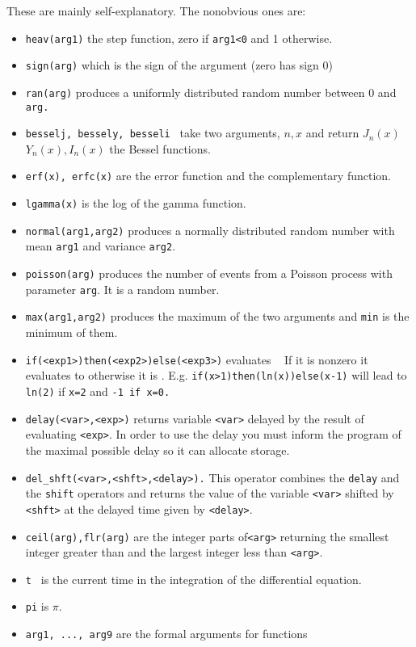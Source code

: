 These are mainly self-explanatory. The nonobvious ones are:
\begin{itemize}\itemsep -.05in
\item {\tt heav(arg1)} the step function, zero if {\tt arg1<0} and 1 otherwise.
\item {\tt sign(arg)} which is the sign of the argument (zero has sign 0)
\item {\tt ran(arg)} produces a uniformly distributed random number
between 0 and {\tt arg.}
\item {\tt besselj, bessely, besseli  } take two arguments, $n,x$ and return
$J_n(x)$ $Y_n(x),I_n(x)$ the Bessel functions.
\item { \tt erf(x), erfc(x)} are the error function and the
complementary function. 
\item {\tt lgamma(x)} is the log of the gamma function. 
\item {\tt normal(arg1,arg2)} produces a normally distributed random number
with mean {\tt arg1}  and variance {\tt arg2}.
\item {\tt poisson(arg)} produces the number of events from a Poisson process with parameter {\tt arg}.  It is a random number.  
\item {\tt max(arg1,arg2)} produces the maximum of the two arguments
and {\tt min}  is 
the minimum of them.
\item {\tt if(<exp1>)then(<exp2>)else(<exp3>)} evaluates {\tt <exp1> }
If it is nonzero 
it evaluates to {\tt <exp2>} otherwise it is { \tt <exp3>}.  E.g. {\tt if(x>1)then(ln(x))else(x-1)}
will lead to {\tt ln(2)}  if {\tt x=2}  and { \tt -1 if x=0.}
\item {\tt delay(<var>,<exp>)} returns variable {\tt <var>} delayed by the result of
 evaluating {\tt <exp>}.  In order to use the delay you must inform
the program of the maximal possible delay so it can allocate storage.
\item {\tt del\_shft(<var>,<shft>,<delay>).} This operator combines the
{\tt delay} and the {\tt shift} operators and returns the value of the
variable {\tt <var>} shifted by {\tt <shft>} at the delayed time given
by {\tt <delay>}.
\item {\tt  ceil(arg),flr(arg)}  are the integer parts of{\tt  <arg>} returning the
 smallest integer greater than and the largest integer less than {\tt <arg>}.  
\item  {\tt t } is the current time in the integration of the differential equation.
\item {\tt  pi}  is $\pi.$ 
\item {\tt arg1, ..., arg9} are the formal arguments for functions 

\end{itemize}
